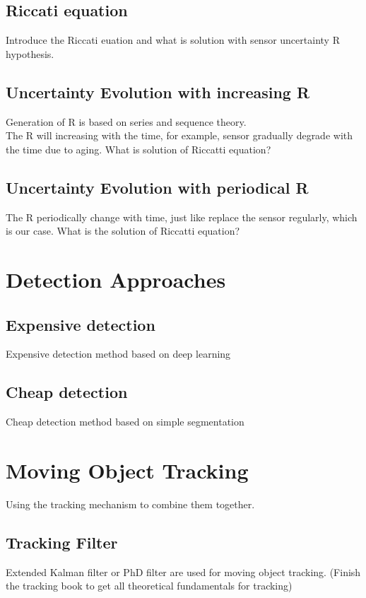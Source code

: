 \documentclass[12pt]{article}
\begin{document}
\subsection{Riccati equation}\label{Riccati_equation}
Introduce the Riccati euation and what is solution with sensor uncertainty R hypothesis.

\subsection{Uncertainty Evolution with increasing R}
Generation of R is based on series and sequence theory.\\
The R will increasing with the time, for example, sensor gradually degrade with the time due to aging. What is solution of Riccatti equation?

\subsection{Uncertainty Evolution with periodical R}
The R periodically change with time, just like replace the sensor regularly, which is our case. What is the solution of Riccatti equation?


\section{Detection Approaches}\label{hybrid_method}

\subsection{Expensive detection}
Expensive detection method based on deep learning\cite{voxelnet}

\subsection{Cheap detection}
Cheap detection method based on simple segmentation

\section{Moving Object Tracking}

Using the tracking mechanism to combine them together.

\subsection{Tracking Filter}
Extended Kalman filter or PhD filter are used for moving object tracking. (Finish the tracking book to get all theoretical fundamentals for tracking)
\end{document}
